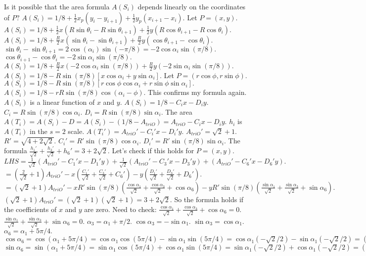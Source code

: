 Is it possible that the area formula $A(S_i)$ depends linearly on the coordinates of $P?$ 
$A(S_i) = 1/8 + \frac{1}{2} x_p (y_i - y_{i+1}) + \frac{1}{2} y_p (x_{i+1} - x_i).$ 
Let $P=(x,y).$ 
$A(S_i) = 1/8 + \frac{1}{2} x (R \sin\theta_i - R \sin\theta_{i+1}) + \frac{1}{2} y (R \cos\theta_{i+1} - R \cos\theta_i).$ 
$A(S_i) = 1/8 + \frac{R}{2} x (\sin\theta_i - \sin\theta_{i+1}) + \frac{R}{2} y (\cos\theta_{i+1} - \cos\theta_i).$ 
$\sin\theta_i - \sin\theta_{i+1} = 2 \cos(\alpha_i) \sin(-\pi/8) = -2 \cos\alpha_i \sin(\pi/8).$ 
$\cos\theta_{i+1} - \cos\theta_i = -2 \sin\alpha_i \sin(\pi/8).$ 
$A(S_i) = 1/8 + \frac{R}{2} x (-2 \cos\alpha_i \sin(\pi/8)) + \frac{R}{2} y (-2 \sin\alpha_i \sin(\pi/8)).$ 
$A(S_i) = 1/8 - R \sin(\pi/8) [ x \cos\alpha_i + y \sin\alpha_i ].$ 
Let $P = (r\cos\phi, r\sin\phi).$ 
$A(S_i) = 1/8 - R \sin(\pi/8) [ r \cos\phi \cos\alpha_i + r \sin\phi \sin\alpha_i ].$ 
$A(S_i) = 1/8 - r R \sin(\pi/8) \cos(\alpha_i - \phi).$ This confirms my formula again. 
$A(S_i)$ is a linear function of $x$ and $y.$ $A(S_i) = 1/8 - C_i x - D_i y.$ 
$C_i = R \sin(\pi/8) \cos\alpha_i.$ $D_i = R \sin(\pi/8) \sin\alpha_i.$ 
The area $A(T_i) = A(S_i) - D = A(S_i) - (1/8 - A_{triO}) = A_{triO} - C_i x - D_i y.$ 
$h_i$ is $A(T_i)$ in the $s=2$ scale. $A(T_i') = A_{triO}' - C_i' x - D_i' y.$ 
$A_{triO}'=\sqrt{2}+1.$ $R' = \sqrt{4+2\sqrt{2}}.$ 
$C_i' = R' \sin(\pi/8) \cos\alpha_i.$ $D_i' = R' \sin(\pi/8) \sin\alpha_i.$ 
The formula $\frac{h_1'}{\sqrt{2}} + \frac{h_3'}{\sqrt{2}} + h_6' = 3+2\sqrt{2}.$ 
Let's check if this holds for $P=(x,y).$ 
$LHS = \frac{1}{\sqrt{2}} (A_{triO}' - C_1' x - D_1' y) + \frac{1}{\sqrt{2}} (A_{triO}' - C_3' x - D_3' y) + (A_{triO}' - C_6' x - D_6' y).$ 
$= (\frac{2}{\sqrt{2}}+1) A_{triO}' - x (\frac{C_1'}{\sqrt{2}} + \frac{C_3'}{\sqrt{2}} + C_6') - y (\frac{D_1'}{\sqrt{2}} + \frac{D_3'}{\sqrt{2}} + D_6').$ 
$= (\sqrt{2}+1) A_{triO}' - x R' \sin(\pi/8) (\frac{\cos\alpha_1}{\sqrt{2}} + \frac{\cos\alpha_3}{\sqrt{2}} + \cos\alpha_6) - y R' \sin(\pi/8) (\frac{\sin\alpha_1}{\sqrt{2}} + \frac{\sin\alpha_3}{\sqrt{2}} + \sin\alpha_6).$ 
$(\sqrt{2}+1) A_{triO}' = (\sqrt{2}+1)(\sqrt{2}+1) = 3+2\sqrt{2}.$ 
So the formula holds if the coefficients of $x$ and $y$ are zero. 
Need to check: 
$\frac{\cos\alpha_1}{\sqrt{2}} + \frac{\cos\alpha_3}{\sqrt{2}} + \cos\alpha_6 = 0.$ 
$\frac{\sin\alpha_1}{\sqrt{2}} + \frac{\sin\alpha_3}{\sqrt{2}} + \sin\alpha_6 = 0.$ 
$\alpha_3 = \alpha_1 + \pi/2.$ $\cos\alpha_3 = -\sin\alpha_1.$ $\sin\alpha_3 = \cos\alpha_1.$ 
$\alpha_6 = \alpha_1 + 5\pi/4.$ $\cos\alpha_6 = \cos(\alpha_1+5\pi/4) = \cos\alpha_1 \cos(5\pi/4) - \sin\alpha_1 \sin(5\pi/4) = \cos\alpha_1 (-\sqrt{2}/2) - \sin\alpha_1 (-\sqrt{2}/2) = (-\sqrt{2}/2)(\cos\alpha_1 - \sin\alpha_1).$ 
$\sin\alpha_6 = \sin(\alpha_1+5\pi/4) = \sin\alpha_1 \cos(5\pi/4) + \cos\alpha_1 \sin(5\pi/4) = \sin\alpha_1 (-\sqrt{2}/2) + \cos\alpha_1 (-\sqrt{2}/2) = (-\sqrt{2}/2)(\sin\alpha_1 + \cos\alpha_1).$

